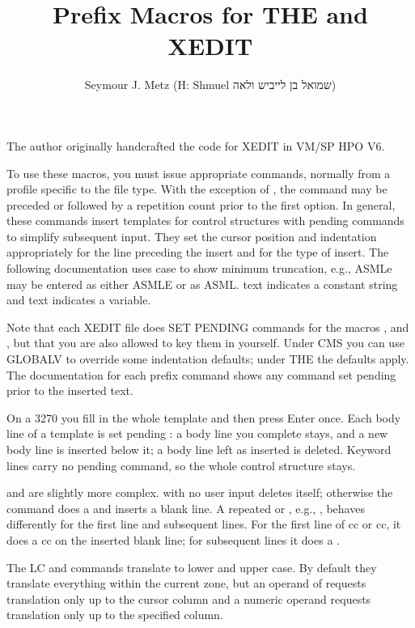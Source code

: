 \documentclass[11pt]{article}
\title{Prefix Macros for THE and XEDIT}
\author{Seymour J. Metz (H: Shmuel {\hebrewfont\beginR שמואל בן לייביש ולאה\endR})}
\date{}
\begin{document}
\maketitle

The author originally handcrafted the code for XEDIT in VM/SP HPO V6.

To use these macros, you must issue appropriate  commands, normally from a profile specific to the file type. With the exception of , the command may be preceded or followed by a repetition count prior to the first option. In general, these commands insert templates for control structures with pending commands to simplify subsequent input. They set the cursor position and indentation appropriately for the line preceding the insert and for the type of insert. The following documentation uses case to show minimum truncation, e.g., ASMLe may be entered as either ASMLE or as ASML.  text indicates a constant string and  text indicates a variable.

Note that each XEDIT file does SET PENDING commands for the macros ,  and , but that you are also allowed to key them in yourself. Under CMS you can use GLOBALV to override some indentation defaults; under THE the defaults apply. The documentation for each prefix command shows any command set pending prior to the inserted text.

On a 3270 you fill in the whole template and then press Enter once. Each body line of a template is set pending : a body line you complete stays, and a new body line is inserted below it; a body line left as inserted is deleted. Keyword lines carry no pending command, so the whole control structure stays.

 and  are slightly more complex.  with no user input deletes itself; otherwise the command does a  and inserts a blank line. A repeated  or , e.g., , behaves differently for the first line and subsequent lines. For the first line of cc or cc, it does a cc on the inserted blank line; for subsequent lines it does a .

The LC and  commands translate to lower and upper case. By default they translate everything within the current zone, but an operand of  requests translation only up to the cursor column and a numeric operand requests translation only up to the specified column.
\end{document}

